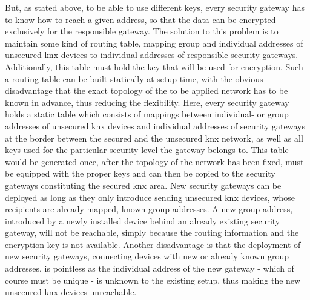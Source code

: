 \begin{center}
 
 \label{fig:firewall}
\end{center}



But, as stated above, to be able to use different keys, every security gateway has to know how to reach a given address, so that the data can be encrypted
exclusively for the responsible gateway. The solution to this problem is to maintain some kind of routing table, mapping group and individual addresses of unsecured
knx devices to individual addresses of responsible security gateways. Additionally, this table must hold the key that will be used for encryption.
Such a routing table can be built statically at setup time, with the obvious disadvantage
that the exact topology of the to be applied network has to be known in advance, thus reducing the flexibility. Here, every security gateway holds a static 
table which consists of mappings between individual- or group addresses of unsecured knx devices and individual addresses of security gateways at the border
between the secured and the unsecured knx network, as well as all keys used for the particular security level the gateway belongs to.
This table would be generated once, after the topology of the network has been fixed, must be equipped with the proper keys and can then
be copied to the security gateways constituting the secured knx area. New security gateways can be deployed as long as they only introduce sending 
unsecured knx devices, whose recipients are already mapped, known group addresses. A new group address, introduced by a newly installed device behind
an already existing security gateway, will not be reachable, simply because the routing information and the encryption key is not available. 
Another disadvantage is that the deployment of new
security gateways, connecting devices with new or already known group addresses, is pointless as the individual address of the new gateway - which of
course must be unique - is unknown to the existing setup, thus making the new unsecured knx devices unreachable.

